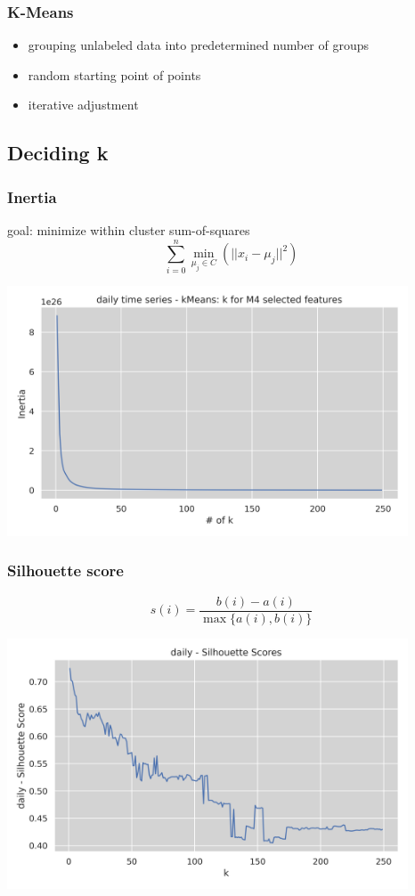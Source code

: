 \documentclass[11pt]{article}
\begin{document}
\subsubsection*{K-Means}
\label{sec:org87dd627}
\begin{itemize}
\item grouping unlabeled data into predetermined number of groups
\item random starting point of points
\item iterative adjustment
\end{itemize}
\subsection*{Deciding k}
\label{sec:orga02511b}
\subsubsection*{Inertia}
\label{sec:org96d9927}
goal: minimize within cluster sum-of-squares
  $$ \sum_{i=0}^n \min_{\mu_j \in C}(\lvert \lvert x_i - \mu_j \rvert \rvert^2) $$
\begin{center}
\includegraphics[width=450px]{./img/daily_kmeans_series_inertia.png}
\end{center}
\subsubsection*{Silhouette score}
\label{sec:orge9ba392}
$$ s(i) = \frac{b(i) - a(i)}{{\max\{a(i),b(i)\}}} $$
\begin{center}
\includegraphics[width=450px]{./img/daily_kmeans_sil_score_series.png}
\end{center}
\end{document}
